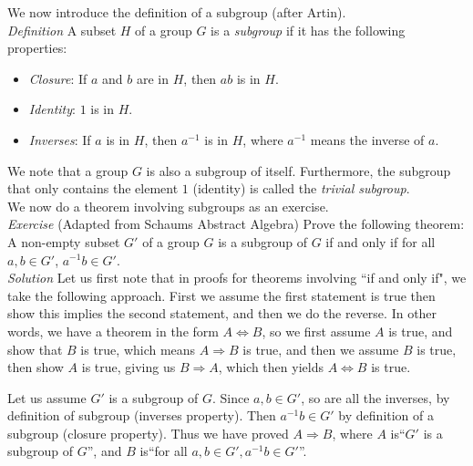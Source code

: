 We now introduce the definition of a subgroup (after Artin).\\

\textit{Definition}  A subset $H$ of a group $G$ is a \textit{subgroup} if it has the following properties:

\begin{itemize}
\item \textit{Closure}: If $a$ and $b$ are in $H$, then $ab$ is in $H$.
\item \textit{Identity}: $1$ is in $H$.
\item \textit{Inverses}: If $a$ is in $H$, then $a^{-1}$ is in $H$, where $a^{-1}$ means the inverse of $a$.
\end{itemize}

We note that a group $G$ is also a subgroup of itself.  Furthermore, the subgroup that only contains the element $1$ (identity) is called the \textit{trivial subgroup}.\\

We now do a theorem involving subgroups as an exercise.\\

\textit{Exercise} (Adapted from Schaums Abstract Algebra)  Prove the following theorem:  A non-empty subset $G'$ of a group $G$ is a subgroup of $G$ if and only if for all $a,b \in G'$, $a^{-1}b \in G'$.\\

\textit{Solution}  Let us first note that in proofs for theorems involving ``if and only if", we take the following approach.  First we assume the first statement is true then show this implies the second statement, and then we do the reverse.  In other words, we have a theorem in the form $A \Longleftrightarrow B$, so we first assume $A$ is true, and show that $B$ is true, which means $A \Longrightarrow B$ is true, and then we assume $B$ is true, then show $A$ is true, giving us $B \Longrightarrow A$, which then yields $A \Longleftrightarrow B$ is true.

Let us assume $G'$ is a subgroup of $G$. Since $a,b \in G'$, so are all the inverses, by definition of subgroup (inverses property).  Then $a^{-1}b \in G'$ by definition of a subgroup (closure property).  Thus we have proved $A \Longrightarrow B$, where $A$ is``$G'$ is a subgroup of $G$'', and $B$ is``for all $a,b \in G', a^{-1}b \in G'$''.\\

